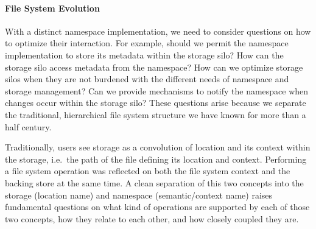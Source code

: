 \paragraph{File System Evolution}

With a distinct namespace implementation, we need to consider questions on how to optimize their interaction.
For example, should we permit the namespace implementation to store its metadata within the storage silo?
How can the storage silo access metadata from the namespace?  How can we optimize storage silos when
they are not burdened with the different needs of namespace and storage management?  Can we provide
mechanisms to notify the namespace when changes occur within the storage silo?
These questions arise because we separate the traditional, hierarchical file system structure we have known for more than a half century.

Traditionally, users see storage as a convolution of location and its context within the storage, i.e.~the path of the file defining its location and context.
Performing a file system operation was reflected on both the file system context and the backing store at the same time.
A clean separation of this two concepts into the storage (location name) and namespace (semantic/context name) raises fundamental questions on what kind of operations are supported by each of those two concepts, how  they relate to each other, and how closely coupled they are.

